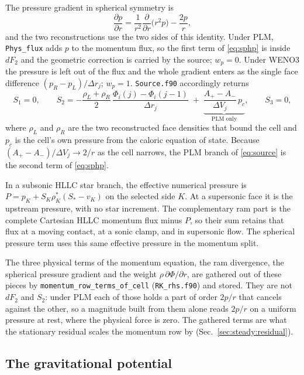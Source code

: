 The pressure gradient in spherical symmetry is
%
\begin{equation}
  \frac{\partial p}{\partial r}
    = \frac{1}{r^2}\frac{\partial}{\partial r}\bigl(r^2 p\bigr)
      - \frac{2p}{r},
  \label{eq:sphp}
\end{equation}
%
and the two reconstructions use the two sides of this identity.  Under PLM,
\texttt{Phys\_flux} adds $p$ to the momentum flux, so the first term of
\eqref{eq:sphp} is inside $dF_2$ and the geometric correction is carried by
the source; $w_p = 0$.  Under WENO3 the pressure is left out of the flux and
the whole gradient enters as the single face difference
$(p_R-p_L)/\Delta r_j$; $w_p = 1$.  \texttt{Source.f90} accordingly returns
%
\begin{equation}
  S_1 = 0,\qquad
  S_2 = -\frac{\rho_L + \rho_R}{2}\,
         \frac{\Phi_i(j) - \Phi_i(j-1)}{\Delta r_j}
        \;+\; \underbrace{\frac{A_+ - A_-}{\Delta V_j}\,p_c}
              _{\text{PLM only}},\qquad
  S_3 = 0,
  \label{eq:source}
\end{equation}
%
where $\rho_L$ and $\rho_R$ are the two reconstructed face densities that
bound the cell and $p_c$ is the cell's own pressure from the caloric equation
of state.  Because $(A_+-A_-)/\Delta V_j \to 2/r$ as the cell narrows, the
PLM branch of \eqref{eq:source} is the second term of \eqref{eq:sphp}.

In a subsonic HLLC star branch, the effective numerical pressure is
$P=p_K+S_K\rho^*_K(S_* - v_K)$ on the selected side $K$.
At a supersonic face it is the upstream pressure, with no star increment.
The complementary ram part is the complete Cartesian HLLC momentum flux
minus $P$, so their sum retains that flux at a moving contact, at a sonic
clamp, and in supersonic flow. The spherical pressure term uses this same
effective pressure in the momentum split.

The three physical terms of the momentum equation, the ram divergence, the
spherical pressure gradient and the weight $\rho\,\partial\Phi/\partial r$,
are gathered out of these pieces by
\texttt{momentum\_row\_terms\_of\_cell} (\texttt{RK\_rhs.f90}) and stored.  They are
not $dF_2$ and $S_2$: under PLM each of those holds a part of order $2p/r$
that cancels against the other, so a magnitude built from them alone reads
$2p/r$ on a uniform pressure at rest, where the physical force is zero.  The
gathered terms are what the stationary residual scales the momentum row by
(Sec.~\ref{sec:steady:residual}).

\subsection{The gravitational potential}
\label{sec:hydro:gravity}

